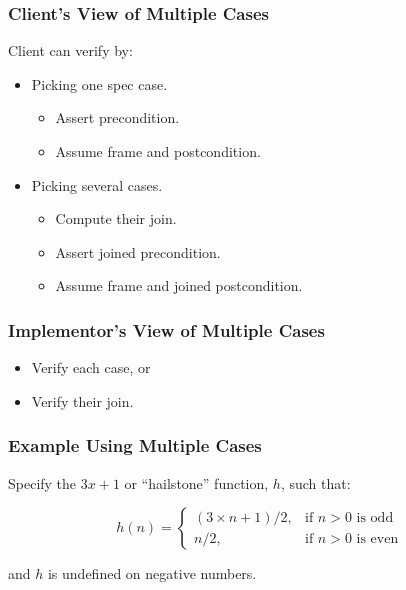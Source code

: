 \begin{frame}
\frametitle{Client's View of Multiple Cases}

Client can verify by:
\begin{itemize}
\item
Picking one spec case.
\begin{itemize}
\item
Assert precondition.

\item
Assume frame and postcondition.
\end{itemize}

\item
Picking several cases.
\begin{itemize}
\item
Compute their join.

\item
Assert joined precondition.

\item
Assume frame and joined postcondition.
\end{itemize}
\end{itemize}
\end{frame}

\begin{frame}
\frametitle{Implementor's View of Multiple Cases}

\begin{itemize}
\item
Verify each case, or

\item
Verify their join.
\end{itemize}
\end{frame}

\begin{frame}
\frametitle{Example Using Multiple Cases}

\begin{example}
Specify the $3x+1$ or ``hailstone'' function, $h$,
such that:

\begin{displaymath}
h(n) = 
\left\{
\begin{array}{ll}
(3 \times n + 1)/2, & \mbox{if $n>0$ is odd} \\
n / 2,              & \mbox{if $n>0$ is even}
\end{array}
\right.
\end{displaymath}

and $h$ is undefined on negative numbers.
\end{example}
\end{frame}

